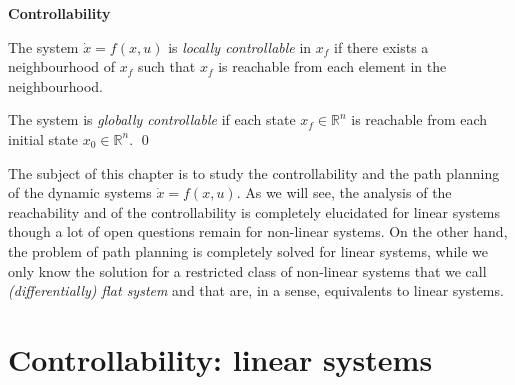\begin{definition}{{\bf Controllability}}

The system $\dot x = f(x,u)$ is {\it locally controllable} in $x_f$ if there exists a neighbourhood of $x_f$ such that $x_f$ is reachable from each element in the neighbourhood.

The system is {\it globally controllable} if each state $x_f \in \mathbb{R}^n$ is reachable from each initial state $x_0 \in \mathbb{R}^n$.
\qed
\end{definition}
The subject of this chapter is to study the controllability and the path planning of the dynamic systems $\dot x = f(x,u)$. As we will see, the analysis of the reachability and of the controllability is completely elucidated for linear systems though a lot of open questions remain for non-linear systems. On the other hand, the problem of path planning is completely solved for linear systems, while we only know the solution for a restricted class of non-linear systems that we call {\it (differentially) flat system} and that are, in a sense, equivalents to linear systems.

\section{Controllability: linear systems}

